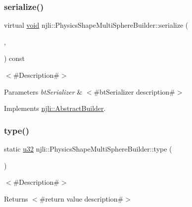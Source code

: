 \subsubsection{\texorpdfstring{serialize()}{serialize()}}
{\footnotesize\ttfamily virtual \mbox{\hyperlink{_thread_8h_af1e856da2e658414cb2456cb6f7ebc66}{void}} njli\+::\+Physics\+Shape\+Multi\+Sphere\+Builder\+::serialize (\begin{DoxyParamCaption}\item[{\mbox{\hyperlink{_thread_8h_af1e856da2e658414cb2456cb6f7ebc66}{void}} $\ast$}]{,  }\item[{bt\+Serializer $\ast$}]{ }\end{DoxyParamCaption}) const\hspace{0.3cm}{\ttfamily [virtual]}}

$<$\#\+Description\#$>$


\begin{DoxyParams}{Parameters}
{\em bt\+Serializer} & $<$\#bt\+Serializer description\#$>$ \\
\hline
\end{DoxyParams}


Implements \mbox{\hyperlink{classnjli_1_1_abstract_builder_ab66b774e02ccb9da554c9aab7fa6d981}{njli\+::\+Abstract\+Builder}}.

\mbox{\label{classnjli_1_1_physics_shape_multi_sphere_builder_aa227e639fe36d060dd20c46fa356e893}} 
\subsubsection{\texorpdfstring{type()}{type()}}
{\footnotesize\ttfamily static \mbox{\hyperlink{_util_8h_a10e94b422ef0c20dcdec20d31a1f5049}{u32}} njli\+::\+Physics\+Shape\+Multi\+Sphere\+Builder\+::type (\begin{DoxyParamCaption}{ }\end{DoxyParamCaption})\hspace{0.3cm}{\ttfamily [static]}}

$<$\#\+Description\#$>$

\begin{DoxyReturn}{Returns}
$<$\#return value description\#$>$ 
\end{DoxyReturn}


